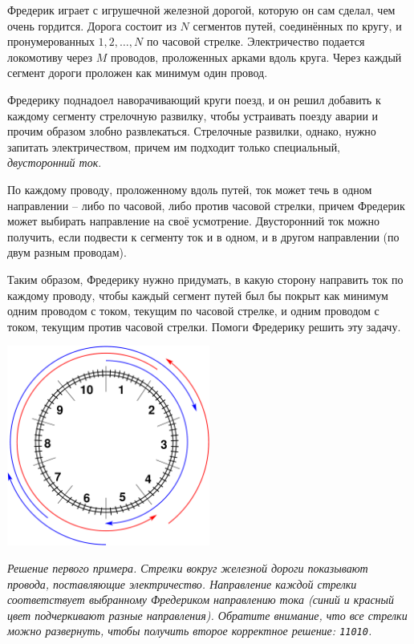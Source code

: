 \ifx\boi\undefined\fi
\def\version{jury-1}
Фредерик играет с игрушечной железной дорогой, которую он сам сделал, чем очень гордится.
Дорога состоит из $N$ сегментов путей, соединённых по кругу, и пронумерованных $1, 2, \dots, N$ по часовой стрелке.
Электричество подается локомотиву через $M$ проводов, проложенных арками вдоль круга. Через каждый сегмент дороги проложен как минимум один провод.

Фредерику поднадоел наворачивающий круги поезд, и он решил добавить к каждому сегменту стрелочную развилку, чтобы устраивать поезду аварии и прочим образом злобно развлекаться.
Стрелочные развилки, однако, нужно запитать электричеством, причем им подходит только специальный, \emph{двусторонний ток}.

По каждому проводу, проложенному вдоль путей, ток может течь в одном направлении -- либо по часовой, либо против часовой стрелки, причем Фредерик может выбирать направление на своё усмотрение.
Двусторонний ток можно получить, если подвести к сегменту ток и в одном, и в другом направлении (по двум разным проводам).

Таким образом, Фредерику нужно придумать, в какую сторону направить ток по каждому проводу, чтобы каждый сегмент путей был бы покрыт как минимум одним проводом с током, текущим по часовой стрелке, 
и одним проводом с током, текущим против часовой стрелки. Помоги Фредерику решить эту задачу.

\vspace{2mm}
\begin{center}
\includegraphics[width=0.5\textwidth]{alternatingfig.pdf}
\end{center}
\vspace{1mm}
{\em Решение первого примера. Стрелки вокруг железной дороги показывают провода, поставляющие электричество. Направление каждой стрелки соответствует выбранному Фредериком направлению тока (синий и красный цвет подчеркивают разные направления). Обратите внимание, что все стрелки можно развернуть, чтобы получить второе корректное решение: \texttt{11010}.}

